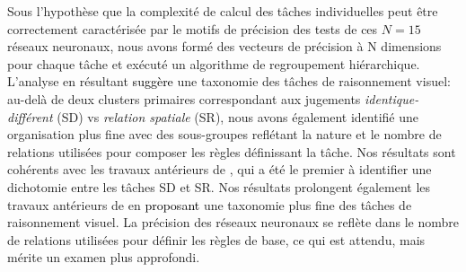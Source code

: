 Sous l'hypoth\`ese que la complexit\'e de calcul des tâches individuelles peut \^etre correctement caract\'eris\'ee par le motifs de pr\'ecision des tests de ces $N=15$ r\'eseaux neuronaux, nous avons form\'e des vecteurs de pr\'ecision \`a N dimensions pour chaque tâche et ex\'ecut\'e un algorithme de regroupement hi\'erarchique. L'analyse en r\'esultant \textcolor{black}{sugg\`ere} une taxonomie des tâches de raisonnement visuel: au-del\`a de deux clusters primaires correspondant aux jugements \textit{identique-diff\'erent} (SD) vs \textit{relation spatiale} (SR), nous avons \'egalement identifi\'e une organisation plus fine avec des sous-groupes refl\'etant la nature et le nombre de relations utilis\'ees pour composer les r\`egles d\'efinissant la tâche. Nos r\'esultats sont coh\'erents avec les travaux ant\'erieurs de \citet{kim2018not}, qui a \'et\'e le premier \`a identifier une dichotomie entre les tâches SD et SR. Nos r\'esultats prolongent \'egalement les travaux ant\'erieurs de \citep{fleuret2011comparing,kim2018not,yihe2019program} en \textcolor{black}{proposant} une taxonomie plus fine des tâches de raisonnement visuel. La pr\'ecision des r\'eseaux neuronaux se refl\`ete dans le nombre de relations utilis\'ees pour d\'efinir les r\`egles de base, ce qui est attendu, mais m\'erite un examen plus approfondi. 


